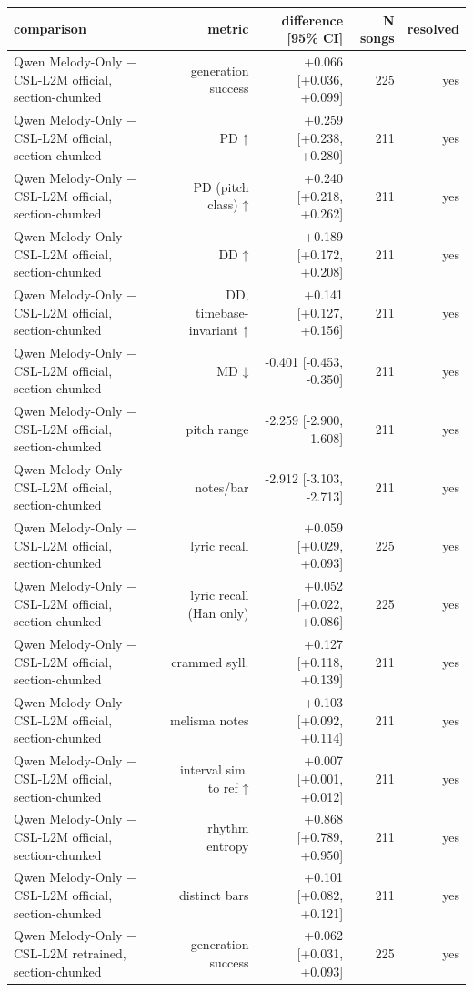 \begin{table}[t]
\centering
\small
\begin{tabular}{lrrrr}
\toprule
comparison & metric & difference [95\% CI] & N songs & resolved \\
\midrule
Qwen Melody-Only $-$ CSL-L2M official, section-chunked & generation success & +0.066 [+0.036, +0.099] & 225 & yes \\
Qwen Melody-Only $-$ CSL-L2M official, section-chunked & PD ↑ & +0.259 [+0.238, +0.280] & 211 & yes \\
Qwen Melody-Only $-$ CSL-L2M official, section-chunked & PD (pitch class) ↑ & +0.240 [+0.218, +0.262] & 211 & yes \\
Qwen Melody-Only $-$ CSL-L2M official, section-chunked & DD ↑ & +0.189 [+0.172, +0.208] & 211 & yes \\
Qwen Melody-Only $-$ CSL-L2M official, section-chunked & DD, timebase-invariant ↑ & +0.141 [+0.127, +0.156] & 211 & yes \\
Qwen Melody-Only $-$ CSL-L2M official, section-chunked & MD ↓ & -0.401 [-0.453, -0.350] & 211 & yes \\
Qwen Melody-Only $-$ CSL-L2M official, section-chunked & pitch range & -2.259 [-2.900, -1.608] & 211 & yes \\
Qwen Melody-Only $-$ CSL-L2M official, section-chunked & notes/bar & -2.912 [-3.103, -2.713] & 211 & yes \\
Qwen Melody-Only $-$ CSL-L2M official, section-chunked & lyric recall & +0.059 [+0.029, +0.093] & 225 & yes \\
Qwen Melody-Only $-$ CSL-L2M official, section-chunked & lyric recall (Han only) & +0.052 [+0.022, +0.086] & 225 & yes \\
Qwen Melody-Only $-$ CSL-L2M official, section-chunked & crammed syll. & +0.127 [+0.118, +0.139] & 211 & yes \\
Qwen Melody-Only $-$ CSL-L2M official, section-chunked & melisma notes & +0.103 [+0.092, +0.114] & 211 & yes \\
Qwen Melody-Only $-$ CSL-L2M official, section-chunked & interval sim. to ref ↑ & +0.007 [+0.001, +0.012] & 211 & yes \\
Qwen Melody-Only $-$ CSL-L2M official, section-chunked & rhythm entropy & +0.868 [+0.789, +0.950] & 211 & yes \\
Qwen Melody-Only $-$ CSL-L2M official, section-chunked & distinct bars & +0.101 [+0.082, +0.121] & 211 & yes \\
Qwen Melody-Only $-$ CSL-L2M retrained, section-chunked & generation success & +0.062 [+0.031, +0.093] & 225 & yes \\

\end{tabular}
\end{table}
